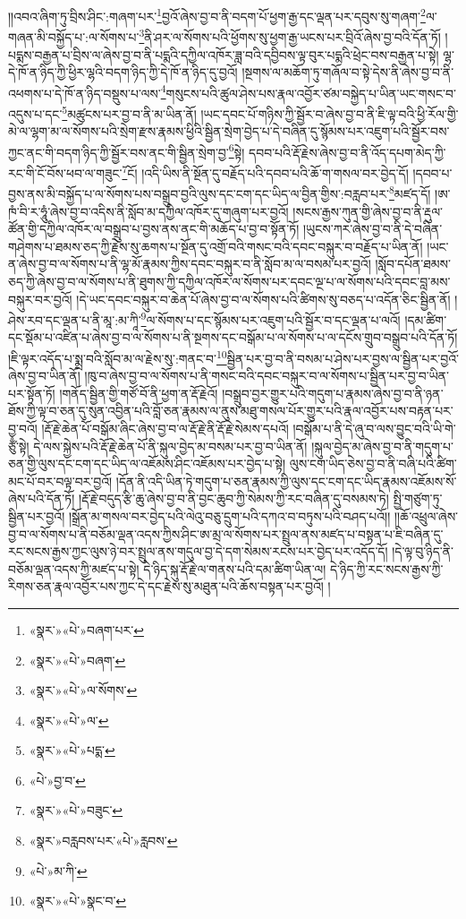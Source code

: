 །།འབའ་ཞིག་ཏུ་བྲིས་ཤིང་:གཞག་པར་\footnote{«སྣར་»«པེ་»བཞག་པར་}བྱའོ་ཞེས་བྱ་བ་ནི་བདག་པོ་ཕྱག་རྒྱ་དང་ལྡན་པར་དབུས་སུ་གཞག་\footnote{«སྣར་»«པེ་»བཞག་}ལ་གཞན་མི་བསྐྱོད་པ་:ལ་སོགས་པ་\footnote{«སྣར་»«པེ་»ལ་སོགས་}ནི་ཤར་ལ་སོགས་པའི་ཕྱོགས་སུ་ཕྱག་རྒྱ་ཡངས་པར་བྲིའོ་ཞེས་བྱ་བའི་དོན་ཏོ། །པདྨས་བརྒྱན་པ་བྲིས་ལ་ཞེས་བྱ་བ་ནི་པདྨའི་དཀྱིལ་འཁོར་ཟླ་བའི་དབྱིབས་ལྟ་བུར་པདྨའི་ཕྲེང་བས་བརྒྱན་པ་སྟེ། ལྷ་དེ་ཁོ་ན་ཉིད་ཀྱི་ཕྱིར་ལྷའི་བདག་ཉིད་ཀྱི་དེ་ཁོ་ན་ཉིད་དུ་བྱའོ། །སྔགས་ལ་མཆོག་ཏུ་གཞོལ་བ་སྟེ་དེས་ནི་ཞེས་བྱ་བ་ནི་འཕགས་པ་དེ་ཁོ་ན་ཉིད་བསྡུས་པ་ལས་\footnote{«སྣར་»«པེ་»ལ་}གསུངས་པའི་ཚུལ་ཤེས་པས་རྣལ་འབྱོར་ཙམ་བསྐྱེད་པ་ཡིན་ཡང་གསང་བ་འདུས་པ་དང་\footnote{«སྣར་»«པེ་»པདྨ་}མཚུངས་པར་བྱ་བ་ནི་མ་ཡིན་ནོ། །ཡང་དབང་པོ་གཉིས་ཀྱི་སྦྱོར་བ་ཞེས་བྱ་བ་ནི་ཇི་ལྟ་བའི་ཕྱི་རོལ་གྱི་མེ་ལ་ལྷག་མ་ལ་སོགས་པའི་སྲེག་རྫས་རྣམས་ཕྱིའི་སྦྱིན་སྲེག་བྱེད་པ་དེ་བཞིན་དུ་སྙོམས་པར་འཇུག་པའི་སྦྱོར་བས་ཀྱང་ནང་གི་བདག་ཉིད་ཀྱི་སྦྱོར་བས་ནང་གི་སྦྱིན་སྲེག་བྱ་\footnote{«པེ་»བྱ་བ་}སྟེ། དབབ་པའི་རྡོ་རྗེས་ཞེས་བྱ་བ་ནི་འོད་དཔག་མེད་ཀྱི་རང་གི་ངོ་བོས་ཕབ་ལ་གཟུང་\footnote{«སྣར་»«པེ་»བཟུང་}ངོ། །འདི་ཡིས་ནི་སྔོན་དུ་བརྗོད་པའི་དབབ་པའི་ཆོ་ག་གསལ་བར་བྱེད་དོ། །དབབ་པ་བྱས་ནས་མི་བསྐྱོད་པ་ལ་སོགས་པས་བསྒྲུབ་བྱའི་ལུས་དང་ངག་དང་ཡིད་ལ་བྱིན་གྱིས་:བརླབ་པར་\footnote{«སྣར་»བརླབས་པར་«པེ་»རླབས་}མཛད་དོ། །ཨ་ཁཾ་བི་ར་ཧཱུཾ་ཞེས་བྱ་བ་འདིས་ནི་སློབ་མ་དཀྱིལ་འཁོར་དུ་གཞུག་པར་བྱའོ། །སངས་རྒྱས་ཀུན་གྱི་ཞེས་བྱ་བ་ནི་རྡུལ་ཚོན་གྱི་དཀྱིལ་འཁོར་ལ་བསྒྲུབ་པ་བྱས་ནས་ནང་གི་མཆོད་པ་བྱ་བ་སྟོན་ཏོ། །ཡུངས་ཀར་ཞེས་བྱ་བ་ནི་དེ་བཞིན་གཤེགས་པ་ཐམས་ཅད་ཀྱི་རྗེས་སུ་ཆགས་པ་སྔོན་དུ་འགྲོ་བའི་གསང་བའི་དབང་བསྐུར་བ་བརྗོད་པ་ཡིན་ནོ། །ཡང་ན་ཞེས་བྱ་བ་ལ་སོགས་པ་ནི་ལྷ་མོ་རྣམས་ཀྱིས་དབང་བསྐུར་བ་ནི་སློབ་མ་ལ་བསམ་པར་བྱའོ། །སློབ་དཔོན་ཐམས་ཅད་ཀྱི་ཞེས་བྱ་བ་ལ་སོགས་པ་ནི་ཐུགས་ཀྱི་དཀྱིལ་འཁོར་ལ་སོགས་པར་དབང་ལྔ་པ་ལ་སོགས་པའི་དབང་བླ་མས་བསྐུར་བར་བྱའོ། །དེ་ཡང་དབང་བསྐུར་བ་ཆེན་པོ་ཞེས་བྱ་བ་ལ་སོགས་པའི་ཚིགས་སུ་བཅད་པ་འདོན་ཅིང་སྦྱིན་ནོ། །ཤེས་རབ་དང་ལྡན་པ་ནི་མཱ་:མ་ཀཱི་\footnote{«པེ་»མ་ཀི་}ལ་སོགས་པ་དང་སྙོམས་པར་འཇུག་པའི་སྦྱོར་བ་དང་ལྡན་པ་ལའོ། །དམ་ཚིག་དང་སྡོམ་པ་འཛིན་པ་ཞེས་བྱ་བ་ལ་སོགས་པ་ནི་སྔགས་དང་བསྒོམ་པ་ལ་སོགས་པ་ལ་དངོས་གྲུབ་བསྒྲུབ་པའི་དོན་ཏོ། །ཇི་ལྟར་འདོད་པ་སྨྲ་བའི་སློབ་མ་ལ་རྗེས་སུ་:གནང་བ་\footnote{«སྣར་»«པེ་»སྣང་བ་}སྦྱིན་པར་བྱ་བ་ནི་བསམ་པ་ཤེས་པར་བྱས་ལ་སྦྱིན་པར་བྱའོ་ཞེས་བྱ་བ་ཡིན་ནོ། །ཁུ་བ་ཞེས་བྱ་བ་ལ་སོགས་པ་ནི་གསང་བའི་དབང་བསྐུར་བ་ལ་སོགས་པ་སྦྱིན་པར་བྱ་བ་ཡིན་པར་སྟོན་ཏོ། །གནོད་སྦྱིན་གྱི་གཙོ་བོ་ནི་ཕྱག་ན་རྡོ་རྗེའོ། །བསྒྲུབ་བྱར་གྱུར་པའི་གདུག་པ་རྣམས་ཞེས་བྱ་བ་ནི་ཉན་ཐོས་ཀྱི་ལྟ་བ་ཅན་དུ་སུན་འབྱིན་པའི་བློ་ཅན་རྣམས་ལ་ནུས་མཐུ་གསལ་པོར་གྱུར་པའི་རྣལ་འབྱོར་པས་བརྟན་པར་བྱ་བའོ། །རྡོ་རྗེ་ཆེན་པོ་བསྒོམ་ཞིང་ཞེས་བྱ་བ་ལ་རྡོ་རྗེ་ནི་རྡོ་རྗེ་སེམས་དཔའོ། །བསྒོམ་པ་ནི་དེ་ཞུ་བ་ལས་བྱུང་བའི་ཡི་གེ་ཙུྃ་སྟེ། དེ་ལས་སྐྱེས་པའི་རྡོ་རྗེ་ཆེན་པོ་ནི་སྐུལ་བྱེད་མ་བསམ་པར་བྱ་བ་ཡིན་ནོ། །སྐུལ་བྱེད་མ་ཞེས་བྱ་བ་ནི་གདུག་པ་ཅན་གྱི་ལུས་དང་ངག་དང་ཡིད་ལ་འཇོམས་ཤིང་འཇོམས་པར་བྱེད་པ་སྟེ། ལུས་ངག་ཡིད་ཅེས་བྱ་བ་ནི་བཞི་པའི་ཚིག་མང་པོ་བར་བལྟ་བར་བྱའོ། །དོན་ནི་འདི་ཡིན་ཏེ་གདུག་པ་ཅན་རྣམས་ཀྱི་ལུས་དང་ངག་དང་ཡིད་རྣམས་འཇོམས་སོ་ཞེས་པའི་དོན་ཏོ། །རྡོ་རྗེ་བདུད་རྩི་ཆུ་ཞེས་བྱ་བ་ནི་བྱང་ཆུབ་ཀྱི་སེམས་ཀྱི་རང་བཞིན་དུ་བསམས་ཏེ། སྤྱི་གཙུག་ཏུ་སྦྱིན་པར་བྱའོ། །སྒྲོན་མ་གསལ་བར་བྱེད་པའི་ལེའུ་བཅུ་དྲུག་པའི་དཀའ་བ་བཏུས་པའི་བཤད་པའོ།། །།ཆོ་འཕྲུལ་ཞེས་བྱ་བ་ལ་སོགས་པ་ནི་བཅོམ་ལྡན་འདས་ཀྱིས་ཤིང་ཨ་མྲ་ལ་སོགས་པར་སྤྲུལ་ནས་མཛད་པ་བསྟན་པ་ཇི་བཞིན་དུ་རང་སངས་རྒྱས་ཀྱང་ལུས་ཉེ་བར་སྤྲུལ་ནས་གདུལ་བྱ་དེ་དག་སེམས་རངས་པར་བྱེད་པར་འདོད་དོ། །དེ་ལྟ་བུ་ཉིད་ནི་བཅོམ་ལྡན་འདས་ཀྱི་མཛད་པ་སྟེ། དེ་ཉིད་སྐུ་རྡོ་རྗེ་ལ་གནས་པའི་དམ་ཚིག་ཡིན་ལ། དེ་ཉིད་ཀྱི་རང་སངས་རྒྱས་ཀྱི་རིགས་ཅན་རྣལ་འབྱོར་པས་ཀྱང་དེ་དང་རྗེས་སུ་མཐུན་པའི་ཆོས་བསྟན་པར་བྱའོ། །
